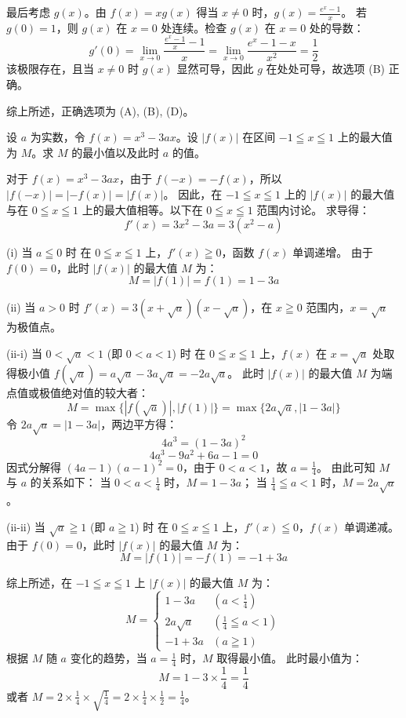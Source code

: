 \begin{questions}
\begin{solution}
最后考虑 $g(x)$。由 $f(x) = xg(x)$ 得当 $x \neq 0$ 时，$g(x) = \frac{e^x - 1}{x}$。
若 $g(0) = 1$，则 $g(x)$ 在 $x=0$ 处连续。检查 $g(x)$ 在 $x=0$ 处的导数：
\[
g'(0) = \lim_{x \to 0} \frac{\frac{e^x - 1}{x} - 1}{x} = \lim_{x \to 0} \frac{e^x - 1 - x}{x^2} = \frac{1}{2}
\]
该极限存在，且当 $x \neq 0$ 时 $g(x)$ 显然可导，因此 $g$ 在处处可导，故选项 (B) 正确。

综上所述，正确选项为 (A), (B), (D)。
\end{solution}

\question
设 $a$ 为实数，令 $f(x)=x^3-3ax$。设 $|f(x)|$ 在区间 $-1 \leqq x \leqq 1$ 上的最大值为 $M$。求 $M$ 的最小值以及此时 $a$ 的值。

\begin{solution}
对于 $f(x)=x^3-3ax$，由于 $f(-x)=-f(x)$，所以 $|f(-x)|=|-f(x)|=|f(x)|$。
因此，在 $-1 \leqq x \leqq 1$ 上的 $|f(x)|$ 的最大值与在 $0 \leqq x \leqq 1$ 上的最大值相等。以下在 $0 \leqq x \leqq 1$ 范围内讨论。
求导得：
\[
f'(x)=3x^2-3a=3(x^2-a)
\]

(i) 当 $a \leqq 0$ 时
在 $0 \leqq x \leqq 1$ 上，$f'(x) \geqq 0$，函数 $f(x)$ 单调递增。
由于 $f(0)=0$，此时 $|f(x)|$ 的最大值 $M$ 为：
\[
M=|f(1)|=f(1)=1-3a
\]

(ii) 当 $a > 0$ 时
$f'(x)=3(x+\sqrt{a})(x-\sqrt{a})$，在 $x \geqq 0$ 范围内，$x=\sqrt{a}$ 为极值点。

(ii-i) 当 $0 < \sqrt{a} < 1$ (即 $0 < a < 1$) 时
在 $0 \leqq x \leqq 1$ 上，$f(x)$ 在 $x=\sqrt{a}$ 处取得极小值 $f(\sqrt{a}) = a\sqrt{a}-3a\sqrt{a} = -2a\sqrt{a}$。
此时 $|f(x)|$ 的最大值 $M$ 为端点值或极值绝对值的较大者：
\[
M=\max\{|f(\sqrt{a})|, |f(1)|\}=\max\{2a\sqrt{a}, |1-3a|\}
\]
令 $2a\sqrt{a}=|1-3a|$，两边平方得：
\[
4a^3=(1-3a)^2
\]
\[
4a^3-9a^2+6a-1=0
\]
因式分解得 $(4a-1)(a-1)^2=0$，由于 $0 < a < 1$，故 $a=\frac{1}{4}$。
由此可知 $M$ 与 $a$ 的关系如下：
当 $0 < a < \frac{1}{4}$ 时，$M=1-3a$；
当 $\frac{1}{4} \leqq a < 1$ 时，$M=2a\sqrt{a}$。

(ii-ii) 当 $\sqrt{a} \geqq 1$ (即 $a \geqq 1$) 时
在 $0 \leqq x \leqq 1$ 上，$f'(x) \leqq 0$，$f(x)$ 单调递减。
由于 $f(0)=0$，此时 $|f(x)|$ 的最大值 $M$ 为：
\[
M=|f(1)|=-f(1)=-1+3a
\]

综上所述，在 $-1 \leqq x \leqq 1$ 上 $|f(x)|$ 的最大值 $M$ 为：
\[
M = 
\begin{cases} 
1-3a & (a < \frac{1}{4}) \\
2a\sqrt{a} & (\frac{1}{4} \leqq a < 1) \\
-1+3a & (a \geqq 1)
\end{cases}
\]
根据 $M$ 随 $a$ 变化的趋势，当 $a=\frac{1}{4}$ 时，$M$ 取得最小值。
此时最小值为：
\[
M = 1 - 3 \times \frac{1}{4} = \frac{1}{4}
\]
或者 $M = 2 \times \frac{1}{4} \times \sqrt{\frac{1}{4}} = 2 \times \frac{1}{4} \times \frac{1}{2} = \frac{1}{4}$。


\end{solution}
\end{questions}
